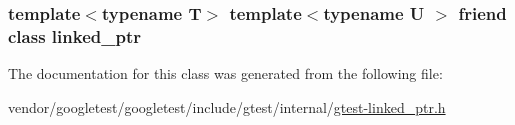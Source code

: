 \subsubsection[{\texorpdfstring{linked\+\_\+ptr}{linked_ptr}}]{\setlength{\rightskip}{0pt plus 5cm}template$<$typename T$>$ template$<$typename U $>$ friend class {\bf linked\+\_\+ptr}\hspace{0.3cm}{\ttfamily [friend]}}\hypertarget{classtesting_1_1internal_1_1linked__ptr_a7763f286ca03a7f7363a033d996c8c1c}{}\label{classtesting_1_1internal_1_1linked__ptr_a7763f286ca03a7f7363a033d996c8c1c}


The documentation for this class was generated from the following file\+:\begin{DoxyCompactItemize}
\item 
vendor/googletest/googletest/include/gtest/internal/\hyperlink{gtest-linked__ptr_8h}{gtest-\/linked\+\_\+ptr.\+h}\end{DoxyCompactItemize}
